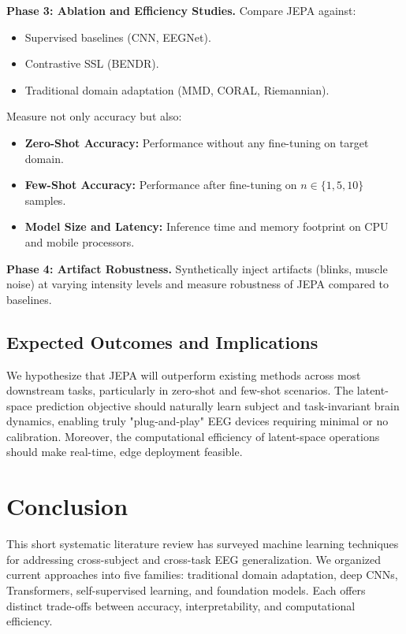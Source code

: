 \documentclass[11pt]{article}
\begin{document}
\textbf{Phase 3: Ablation and Efficiency Studies.} Compare JEPA against:
\begin{itemize}
    \item Supervised baselines (CNN, EEGNet).
    \item Contrastive SSL (BENDR).
    \item Traditional domain adaptation (MMD, CORAL, Riemannian).
\end{itemize}

Measure not only accuracy but also:
\begin{itemize}
    \item \textbf{Zero-Shot Accuracy:} Performance without any fine-tuning on target domain.
    
    \item \textbf{Few-Shot Accuracy:} Performance after fine-tuning on $n \in \{1, 5, 10\}$ samples.
    
    \item \textbf{Model Size and Latency:} Inference time and memory footprint on CPU and mobile processors.
\end{itemize}

\textbf{Phase 4: Artifact Robustness.} Synthetically inject artifacts (blinks, muscle noise) at varying intensity levels and measure robustness of JEPA compared to baselines.

\subsection{Expected Outcomes and Implications}

We hypothesize that JEPA will outperform existing methods across most downstream tasks, particularly in zero-shot and few-shot scenarios. The latent-space prediction objective should naturally learn subject and task-invariant brain dynamics, enabling truly "plug-and-play" EEG devices requiring minimal or no calibration. Moreover, the computational efficiency of latent-space operations should make real-time, edge deployment feasible.

\section{Conclusion}\label{sec:conclusion}

This short systematic literature review has surveyed machine learning techniques for addressing cross-subject and cross-task EEG generalization. We organized current approaches into five families: traditional domain adaptation, deep CNNs, Transformers, self-supervised learning, and foundation models. Each offers distinct trade-offs between accuracy, interpretability, and computational efficiency.
\end{document}
